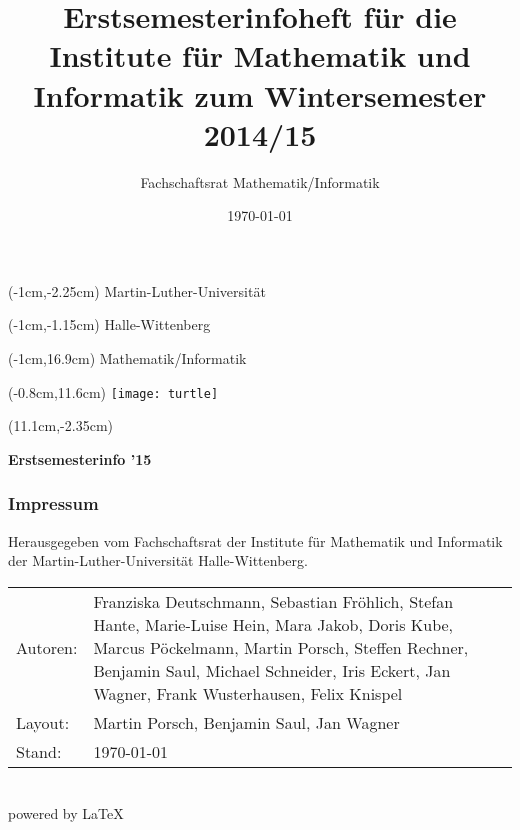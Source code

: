 
\thispagestyle{empty}
\title{Erstsemesterinfoheft für die Institute für Mathematik und Informatik zum
       Wintersemester 2014/15}
\author{Fachschaftsrat Mathematik/Informatik}
\date{\today}

\fontsize{1.05cm}{1cm}
\begin{textblock*}{\paperwidth}(-1cm,-2.25cm)
 \textsf{Martin-Luther-Universität}
\end{textblock*}
\begin{textblock*}{\paperwidth}(-1cm,-1.15cm)
 \textsf{Halle-Wittenberg}
\end{textblock*}
\begin{textblock*}{\paperwidth}(-1cm,16.9cm)
 \textsf{Mathematik/Informatik}
\end{textblock*}
\begin{textblock*}{\paperwidth}(-0.8cm,11.6cm)
 \texttt{[image: turtle]}
\end{textblock*}
\fontsize{2.06cm}{1cm}
\begin{textblock*}{\paperwidth}(11.1cm,-2.35cm)
 \begin{sideways}
  \textsf{\textbf{Erstsemesterinfo ’15}}
 \end{sideways}
\end{textblock*}
\normalsize

\newpage
\thispagestyle{empty}
\subsubsection{Impressum}
Herausgegeben vom Fachschaftsrat der Institute für Mathematik und Informatik der
Martin-Luther-Universität Halle-Wittenberg.\\[1.0em]
\begin{tabularx}{\textwidth}{@{}lX}
 Autoren: & Franziska Deutschmann,                                              %
            Sebastian Fröhlich,
            Stefan Hante,
            Marie-Luise Hein,
            Mara Jakob,
            Doris Kube,
            Marcus Pöckelmann,
            Martin Porsch,
            Steffen Rechner,
            Benjamin Saul,
            Michael Schneider,
            Iris Eckert,
            Jan Wagner,
            Frank Wusterhausen,
            Felix Knispel\\
 Layout:  & Martin Porsch, Benjamin Saul, Jan Wagner\\
 Stand:   & \today\\
\end{tabularx}\\[1.0em]
powered by \LaTeX
\pagebreak

